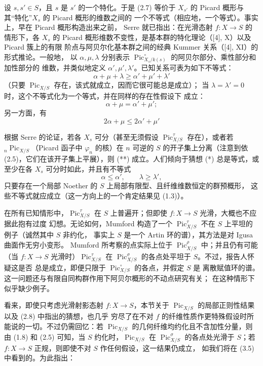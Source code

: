  设 $s,s'\in S$，且 $s$ 是 $s'$ 的一个特化。于是 (2.7)
等价于 $X_{s'}$ 的 Picard 概形与其“特化”$X_s$ 的 Picard 概形的维数之间的
一个不等式（相应地，一个等式）。事实上，早在 Picard 概形构造出来之前，
Serre 就已指出：在光滑态射 $f:X\longrightarrow S$ 的情形下，各 $X_s$ 的
Picard 概形维数不变性，是基本群的特化理论（[4], X）以及 Picard 簇上的有限
阶点与阿贝尔化基本群之间的经典 Kummer 关系（[4], XI）的形式推论。一般地，
以 $\alpha,\mu,\lambda$ 分别表示
$\operatorname{Pic}_{X_s/k(s)}^\circ$ 的阿贝尔部分、乘性部分和加性部分的
维数，并类似地定义 $\alpha',\mu',\lambda'$。已知关系可表为如下不等式：
\[
\tag{*}\alpha+\mu+\lambda\geq\alpha'+\mu'+\lambda'
\]
（只要 $\operatorname{Pic}_{X/S}$ 存在，该式就成立，因而它很可能总是成立）；
当 $\lambda=\lambda'=0$ 时，这个不等式化为一个等式，并在同样的存在性假设下
成立：
\[
\alpha+\mu=\alpha'+\mu' ;
\]
另一方面，有
\[
\tag{**}2\alpha+\mu\leq2\alpha'+\mu'
\]

根据 Serre 的论证，若各 $X_s$ 可分（甚至无须假设
$\operatorname{Pic}_{X/S}^\tau$ 存在），或者若
${}_n\operatorname{Pic}_{X/S}$（Picard 函子中 $\varphi_n$ 的核）在 $n$ 可逆的 $S$ 的开子集上分离（注意到依 (2.5)，它们在该开子集上平展），则 (**) 成立。人们倾向于猜想
(*) 总是等式，或至少在各 $X_s$ 可分时如此，并且有不等式
\[
\tag{***}\alpha\leq\alpha',\qquad\lambda\geq\lambda',
\]
只要存在一个局部 Noether 的 $S$ 上局部有限型、且纤维维数恒定的群预概形，
这些不等式就应成立（这一方向上的一个肯定结果见 (1.3)）。

 在所有已知情形中，$\operatorname{Pic}_{X/S}^\tau$ 在
$S$ 上普遍开；但即使 $f:X\longrightarrow S$ 光滑，大概也不应据此抱有过度
幻想。无论如何，Mumford 构造了一个
$\operatorname{Pic}_{X/S}^\tau$ 不在 $S$ 上平坦的例子（诚然其中 $S$ 非约化，
事实上 $S$ 是一个 Artin 环的谱），其方法是对 Igusa 曲面作无穷小变形。
Mumford 所考察的点实际上位于 $\operatorname{Pic}_{X/S}^\rho$ 中；并且仍有可能
（当 $f:X\longrightarrow S$ 光滑时）$\operatorname{Pic}_{X/S}^\tau$ 在
$\operatorname{Pic}_{X/S}^\sigma$ 的各点处平坦于 $S$。不过，报告人怀疑这是否
总是成立，即便只限于 $\operatorname{Pic}_{X/S}^\circ$ 的各点，并假定 $S$ 是
离散赋值环的谱。这一问题还与有限自同构群作用下阿贝尔概形的不动点研究有关；
在这种情形下似乎缺少例子。

看来，即使只考虑光滑射影态射 $f:X\longrightarrow S$，本节关于
$\operatorname{Pic}_{X/S}$ 的局部正则性结果以及 (2.8) 中指出的猜想，也几乎
穷尽了在不对 $f$ 的纤维性质作更特殊假设时所能说的一切。不过仍需回忆：若
$\operatorname{Pic}_{X/S}$ 的几何纤维均约化且不含加性分量，则由 (1.8) 和
(2.5) 可知，当 $S$ 约化时，$\operatorname{Pic}_{X/S}$ 在
$\operatorname{Pic}_{X/S}^\sigma$ 的各点处光滑于 $S$；若
$f:X\longrightarrow S$ 正规，则即使不对 $S$ 作任何假设，这一结果仍成立，
如我们将在 (3.5) 中看到的。为此指出：

